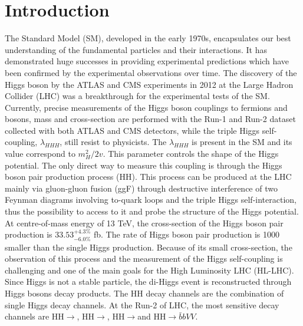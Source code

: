 \newpage
\chapter{Introduction}
\label{Intro}

The Standard Model (SM), developed in the early 1970s, encapsulates our best understanding of the fundamental particles and their interactions. It has demonstrated huge successes in providing experimental predictions which have been confirmed by the experimental observations over time. The discovery of the Higgs boson by the ATLAS and CMS experiments in 2012 at the Large Hadron Collider (LHC) was a breakthrough for the experimental tests of the SM. Currently, precise measurements of the Higgs boson couplings to fermions and bosons, mass and cross-section are performed with the Run-1 and Run-2 dataset collected with both ATLAS and CMS detectors, while the triple Higgs self-coupling, $\lambda_{HHH}$, still resist to physicists. The $\lambda_{HHH}$ is present in the SM and its value correspond to $m_{H}^2/2v$. This parameter controls the shape of the Higgs potential. The only direct way to measure this coupling is through the Higgs boson pair production process (HH). This process can be produced at the LHC mainly via gluon-gluon fusion (ggF) through destructive interference of two Feynman diagrams involving to-quark loops and the triple Higgs self-interaction, thus the possibility to access to it and probe the structure of the Higgs potential. At centre-of-mass energy of 13 TeV, the cross-section of the Higgs boson pair production is $33.53_{-6.0\%}^{+4.3\%}$ fb. The rate of Higgs boson pair production is 1000 smaller than the single Higgs production. Because of its small cross-section, the observation of this process and the measurement of the Higgs self-coupling is challenging and one of the main goals for the High Luminosity LHC (HL-LHC). 
Since Higgs is not a stable particle, the di-Higgs event is reconstructed through Higgs bosons decay products. The HH decay channels are the combination of single Higgs decay channels. At the Run-2 of LHC, the most sensitive decay channels are HH$\to$\bbbb, HH$\to$\bbtt, HH$\to$\bbyy and HH$\to\bar{b}bVV$. 
\\

